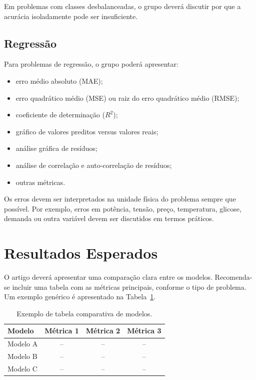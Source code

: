 \documentclass[a4paper]{ifacconf}
\begin{document}
Em problemas com classes desbalanceadas, o grupo deverá discutir por que a acurácia isoladamente pode ser insuficiente.

\subsection{Regressão}

Para problemas de regressão, o grupo poderá apresentar:
\begin{itemize}
    \item erro médio absoluto (MAE);
    \item erro quadrático médio (MSE) ou raiz do erro quadrático médio (RMSE);
    \item coeficiente de determinação ($R^2$);
    \item gráfico de valores preditos versus valores reais;
    \item análise gráfica de resíduos;
    \item análise de correlação e auto-correlação de resíduos;
    \item outras métricas.
\end{itemize}

Os erros devem ser interpretados na unidade física do problema sempre que possível. Por exemplo, erros em potência, tensão, preço, temperatura, glicose, demanda ou outra variável devem ser discutidos em termos práticos.

\section{Resultados Esperados}

O artigo deverá apresentar uma comparação clara entre os modelos. Recomenda-se incluir uma tabela com as métricas principais, conforme o tipo de problema. Um exemplo genérico é apresentado na Tabela~\ref{tab:modelos}.

\begin{table}[hb]
\begin{center}
\caption{Exemplo de tabela comparativa de modelos.}\label{tab:modelos}
\begin{tabular}{lccc}
Modelo & Métrica 1 & Métrica 2 & Métrica 3 \\\hline
Modelo A & -- & -- & -- \\
Modelo B & -- & -- & -- \\
Modelo C & -- & -- & -- \\\hline
\end{tabular}
\end{center}
\end{table}
\end{document}
